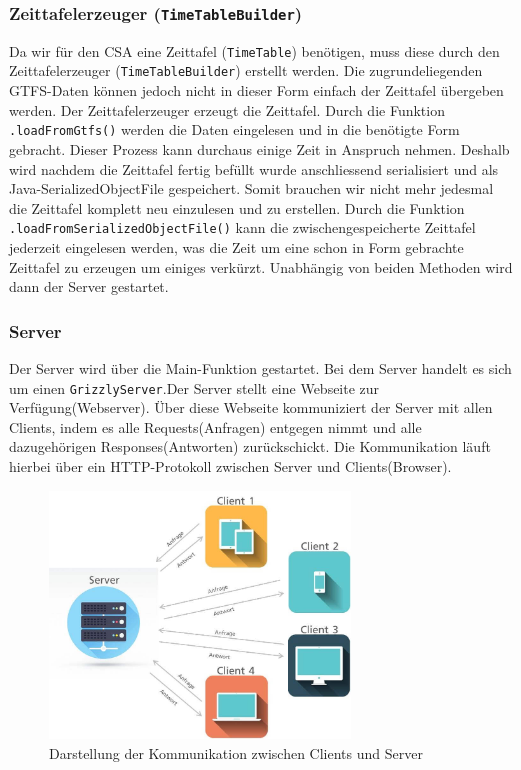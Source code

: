 \subsubsection{Zeittafelerzeuger (\texttt{TimeTableBuilder})}
Da wir für den CSA eine Zeittafel (\texttt{TimeTable}) benötigen, muss diese durch den Zeittafelerzeuger (\texttt{TimeTableBuilder}) erstellt werden. Die zugrundeliegenden GTFS-Daten können jedoch nicht in dieser Form einfach der Zeittafel übergeben werden. Der Zeittafelerzeuger erzeugt die Zeittafel. Durch die Funktion \texttt{.loadFromGtfs()} werden die Daten eingelesen und in die benötigte Form gebracht. Dieser Prozess kann durchaus einige Zeit in Anspruch nehmen. Deshalb wird nachdem die Zeittafel fertig befüllt wurde anschliessend serialisiert und als Java-SerializedObjectFile gespeichert. Somit brauchen wir nicht mehr jedesmal die Zeittafel komplett neu einzulesen und zu erstellen. Durch die Funktion \texttt{.loadFromSerializedObjectFile()} kann die zwischengespeicherte Zeittafel jederzeit eingelesen werden, was die Zeit um eine schon in Form gebrachte Zeittafel zu erzeugen um einiges verkürzt. Unabhängig von beiden Methoden wird dann der Server gestartet.

\subsubsection{Server}
Der Server wird über die Main-Funktion gestartet. Bei dem Server handelt es sich um einen \texttt{GrizzlyServer}.Der Server stellt eine Webseite zur Verfügung(Webserver). Über diese Webseite kommuniziert der Server mit allen Clients, indem es alle Requests(Anfragen) entgegen nimmt und alle dazugehörigen Responses(Antworten) zurückschickt. Die Kommunikation läuft hierbei über ein HTTP-Protokoll zwischen Server und Clients(Browser). 

\begin{figure}[htb]
	\centering
	\includegraphics[width=8cm]{img/serverrequestresponse.jpg}
	\caption{Darstellung der Kommunikation zwischen Clients und Server}
	\label{fig:serverrequestresponse}
\end{figure}




